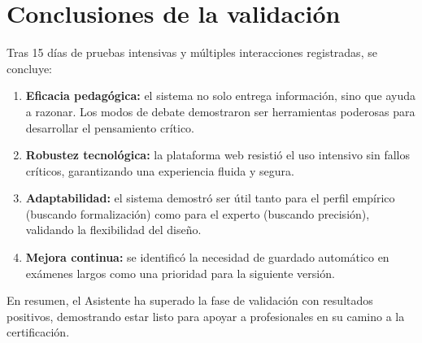 \section{Conclusiones de la validación}

Tras 15 días de pruebas intensivas y múltiples interacciones registradas, se concluye:

\begin{enumerate}
\item \textbf{Eficacia pedagógica:} el sistema no solo entrega información, sino que ayuda a razonar. Los modos de debate demostraron ser herramientas poderosas para desarrollar el pensamiento crítico.
\item \textbf{Robustez tecnológica:} la plataforma web resistió el uso intensivo sin fallos críticos, garantizando una experiencia fluida y segura.
\item \textbf{Adaptabilidad:} el sistema demostró ser útil tanto para el perfil empírico (buscando formalización) como para el experto (buscando precisión), validando la flexibilidad del diseño.
\item \textbf{Mejora continua:} se identificó la necesidad de guardado automático en exámenes largos como una prioridad para la siguiente versión.
\end{enumerate}

En resumen, el Asistente ha superado la fase de validación con resultados positivos, demostrando estar listo para apoyar a profesionales en su camino a la certificación.